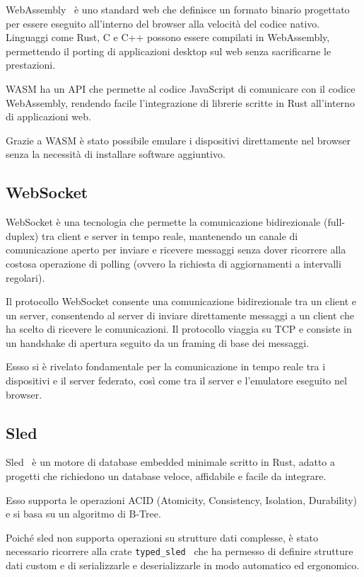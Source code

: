 WebAssembly~\cite{WebAssemblyCoreSpecification1} è uno standard web che definisce un formato binario progettato per essere eseguito all'interno del browser alla 
velocità del codice nativo. 
Linguaggi come Rust, C e C++ possono essere compilati in WebAssembly, permettendo il porting di applicazioni desktop 
sul web senza sacrificarne le prestazioni. 

WASM ha un API che permette al codice JavaScript di comunicare con il codice WebAssembly, rendendo facile l'integrazione
di librerie scritte in Rust all'interno di applicazioni web.

Grazie a WASM è stato possibile emulare i dispositivi direttamente nel browser senza la necessità di installare
software aggiuntivo.

\subsection{WebSocket}

WebSocket è una tecnologia che permette la comunicazione bidirezionale (full-duplex) tra client e server in tempo reale,
mantenendo un canale di comunicazione aperto per inviare e ricevere messaggi senza dover ricorrere 
alla costosa operazione di polling (ovvero la richiesta di aggiornamenti a intervalli regolari).  

Il protocollo WebSocket consente una comunicazione bidirezionale tra un client
e un server, consentendo al server di inviare direttamente messaggi a un client
che ha scelto di ricevere le comunicazioni. Il protocollo viaggia su TCP e consiste in un handshake di apertura
seguito da un framing di base dei messaggi.~\cite{rfc6455}

Essso si è rivelato fondamentale per la comunicazione in tempo reale tra i dispositivi e il server federato, 
così come tra il server e l'emulatore eseguito nel browser. 

\subsection{Sled}

Sled~\cite{sled_website} è un motore di database embedded minimale scritto in Rust, adatto a progetti che richiedono un database
veloce, affidabile e facile da integrare. 

Esso supporta le operazioni ACID (Atomicity, Consistency, Isolation, Durability) e si basa su un algoritmo di B-Tree.

Poiché sled non supporta operazioni su strutture dati complesse, è stato necessario ricorrere alla crate \texttt{typed\_sled}~\cite{typed_sled}
che ha permesso di definire strutture dati custom e di serializzarle e deserializzarle in modo automatico ed ergonomico.

